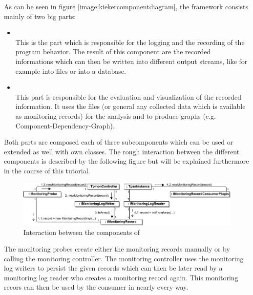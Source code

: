 \documentclass[a4paper, oneside, 11pt]{scrartcl}
\begin{document}
      As can be seen in figure \ref{image:kiekercomponentdiagram}, the framework consists mainly of two big parts:
      \begin{itemize}
	\item \textbf{\KiekerMonitoring}\\
	  This is the part which is responsible for the logging and the recording of the program behavior. The result of this component are the recorded informations which can then be written into different output streams, like for example into files or into a database.
	\item \textbf{\KiekerAnalysis}\\
	  This part is responsible for the evaluation and visualization of the recorded information. It uses the files (or general any collected data which is available as monitoring records) for the analysis and to produce graphs (e.g. Component-Dependency-Graph).
      \end{itemize}
      Both parts are composed each of three subcomponents which can be used or extended as well with own classes. The rough interaction between the different components is described by the following figure but will be explained furthermore in the course of this tutorial.
      \begin{figure}[H]
	\begin{center}
	  \includegraphics[width=1.0\textwidth]{kiekerCommunications-revisedReArranged-woMonitoringLog-bw.pdf}
	  \caption{Interaction between the components of \Kieker}
	\end{center}
      \end{figure}
      The monitoring probes create either the monitoring records manually or by calling the monitoring controller. The monitoring controller uses the monitoring log writers to persist the given records which can then be later read by a monitoring log reader who creates a monitoring record again. This monitoring recors can then be used by the consumer in nearly every way.
\end{document}
